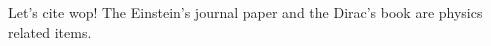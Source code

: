 \documentclass[letterpaper,10pt]{article}
\begin{document}
Let's cite wop! The Einstein's journal paper \cite{einstein} and the Dirac's book \cite{dirac} are physics related items. 

\printbibliography %
\end{document}
